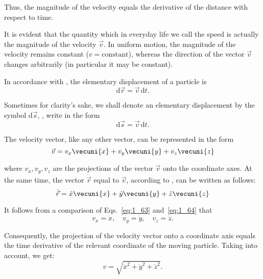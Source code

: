 \noindent
Thus, the magnitude of the velocity equals the derivative of the distance with respect to time.

It is evident that the quantity which in everyday life we call the speed is actually the magnitude of the velocity $\vec{v}$. In uniform motion, the magnitude of the velocity remains constant ($v=\text{constant}$), whereas the direction of the vector $\vec{v}$ changes arbitrarily (in particular it may be constant).

In accordance with , the elementary displacement of a particle is
\begin{equation}\label{eq:1_61}
\mathrm{d}\vec{r} = \vec{v}\,\mathrm{d}{t}. 
\end{equation}

\noindent
Sometimes for clarity's sake, we shall denote an elementary displacement by the symbol $\mathrm{d}\vec{s}$, \ie, write  in the form
\begin{equation}\label{eq:1_62}
\mathrm{d}\vec{s} = \vec{v}\,\mathrm{d}{t}. 
\end{equation}

The velocity vector, like any other vector, can be represented in the form
\begin{equation}\label{eq:1_63}
\vec{v} = v_x\vecuni{x} + v_y\vecuni{y} + v_z\vecuni{z}
\end{equation}

\noindent
where $v_x, v_y, v_z$ are the projections of the vector $\vec{v}$ onto the coordinate axes. At the same time, the vector $\dot{\vec{r}}$ equal to $\vec{v}$, according to , can be written as follows:
\vspace{-12pt}
\begin{equation}\label{eq:1_64}
\dot{\vec{r}} = \dot{x}\vecuni{x} + \dot{y}\vecuni{y} + \dot{z}\vecuni{z}
\end{equation}

\noindent
It follows from a comparison of Eqs.~\eqref{eq:1_63} and~\eqref{eq:1_64} that
\begin{equation}\label{eq:1_65}
v_x = \dot{x},\quad v_y = \dot{y},\quad v_z = \dot{z}.
\end{equation}

\noindent
Consequently, the projection of the velocity vector onto a coordinate axis equals the time derivative of the relevant coordinate of the moving particle. Taking  into account, we get:
\begin{equation}\label{eq:1_66}
v = \sqrt{\dot{x}^2 + \dot{y}^2 + \dot{z}^2}.
\end{equation}

